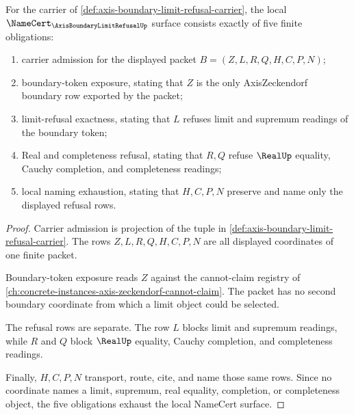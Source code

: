 \begin{theorem}
\label{thm:axis-boundary-limit-refusal-namecert-obligations}
For the carrier of \autoref{def:axis-boundary-limit-refusal-carrier}, the
local $\NameCert_{\AxisBoundaryLimitRefusalUp}$ surface consists exactly of
five finite obligations:
\begin{enumerate}
\item carrier admission for the displayed packet $B=(Z,L,R,Q,H,C,P,N)$;
\item boundary-token exposure, stating that $Z$ is the only AxisZeckendorf
boundary row exported by the packet;
\item limit-refusal exactness, stating that $L$ refuses limit and supremum
readings of the boundary token;
\item Real and completeness refusal, stating that $R,Q$ refuse $\RealUp$
equality, Cauchy completion, and completeness readings;
\item local naming exhaustion, stating that $H,C,P,N$ preserve and name only
the displayed refusal rows.
\end{enumerate}
\end{theorem}
\begin{proof}
Carrier admission is projection of the tuple in
\autoref{def:axis-boundary-limit-refusal-carrier}. The rows
$Z,L,R,Q,H,C,P,N$ are all displayed coordinates of one finite packet.

Boundary-token exposure reads $Z$ against the cannot-claim registry of
\autoref{ch:concrete-instances-axis-zeckendorf-cannot-claim}. The packet has no
second boundary coordinate from which a limit object could be selected.

The refusal rows are separate. The row $L$ blocks limit and supremum readings,
while $R$ and $Q$ block $\RealUp$ equality, Cauchy completion, and
completeness readings.

Finally, $H,C,P,N$ transport, route, cite, and name those same rows. Since no
coordinate names a limit, supremum, real equality, completion, or completeness
object, the five obligations exhaust the local NameCert surface.
\end{proof}

